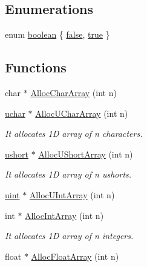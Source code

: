 \subsection*{Enumerations}
\begin{DoxyCompactItemize}
\item 
enum \hyperlink{namespacegft_a46216ea11b673fe8800c5666be2e5cc1}{boolean} \{ \hyperlink{namespacegft_a46216ea11b673fe8800c5666be2e5cc1af62c5372f4ab27de64940152597e29d9}{false}, 
\hyperlink{namespacegft_a46216ea11b673fe8800c5666be2e5cc1a67a7a3b7b088c1b0b77620ff2eeb9fc3}{true}
 \}
\end{DoxyCompactItemize}
\subsection*{Functions}
\begin{DoxyCompactItemize}
\item 
char $\ast$ \hyperlink{namespacegft_a5fdaa35ca4fb5b361349ad65df62f18d}{Alloc\-Char\-Array} (int n)
\item 
\hyperlink{namespacegft_a6411e297d5ac5aa9b91a37da00952197}{uchar} $\ast$ \hyperlink{namespacegft_a5019091af40bed4374b6017283935371}{Alloc\-U\-Char\-Array} (int n)
\begin{DoxyCompactList}\small\item\em It allocates 1\-D array of n characters. \end{DoxyCompactList}\item 
\hyperlink{namespacegft_a878518cf75338c097e2c8e9b10bfb00d}{ushort} $\ast$ \hyperlink{namespacegft_a9092559de6e55ef73ff423a7e384fa31}{Alloc\-U\-Short\-Array} (int n)
\begin{DoxyCompactList}\small\item\em It allocates 1\-D array of n ushorts. \end{DoxyCompactList}\item 
\hyperlink{namespacegft_a4582b4dfe448021d46b76a75fb47799b}{uint} $\ast$ \hyperlink{namespacegft_a0b0afae6601a53d7ae797e9e84ea2943}{Alloc\-U\-Int\-Array} (int n)
\item 
int $\ast$ \hyperlink{namespacegft_a0819a428b865b1c9f6195c43bf7a1a06}{Alloc\-Int\-Array} (int n)
\begin{DoxyCompactList}\small\item\em It allocates 1\-D array of n integers. \end{DoxyCompactList}\item 
float $\ast$ \hyperlink{namespacegft_ac12cfe531311299124dee663341b144d}{Alloc\-Float\-Array} (int n)

\end{DoxyCompactItemize}

